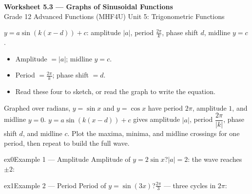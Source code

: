 \documentclass[11pt]{article}
\begin{document}
\begin{center}
{\LARGE\bfseries\color{titleblue}Worksheet 5.3 --- Graphs of Sinusoidal Functions}\\[2pt]
{\small Grade 12 Advanced Functions (MHF4U) \textperiodcentered{} Unit 5: Trigonometric Functions}
\end{center}

\begin{ideabox}
$y=a\sin(k(x-d))+c$: amplitude $|a|$, period $\tfrac{2\pi}{k}$, phase shift $d$, midline $y=c$.
\begin{itemize}[leftmargin=*,itemsep=2pt]
  \item Amplitude $=|a|$; midline $y=c$.
  \item Period $=\tfrac{2\pi}{k}$; phase shift $=d$.
  \item Read these four to sketch, or read the graph to write the equation.
\end{itemize}
\end{ideabox}

\begin{learnbox}
Graphed over radians, $y=\sin x$ and $y=\cos x$ have period $2\pi$, amplitude $1$, and midline $y=0$.
$y=a\sin\!\left(k(x-d)\right)+c$ gives amplitude $|a|$, period $\dfrac{2\pi}{|k|}$, phase shift $d$, and midline $c$.
Plot the maxima, minima, and midline crossings for one period, then repeat to build the full wave.
\end{learnbox}


\begin{example}{ex0}{Example 1 --- Amplitude}
Amplitude of $y=2\sin x$?\soln $|a|=2$: the wave reaches $\pm2$:\begin{center}\end{center}
\end{example}

\begin{example}{ex1}{Example 2 --- Period}
Period of $y=\sin(3x)$?\soln $\tfrac{2\pi}{3}$ — three cycles in $2\pi$:\begin{center}\end{center}
\end{example}
\end{document}
